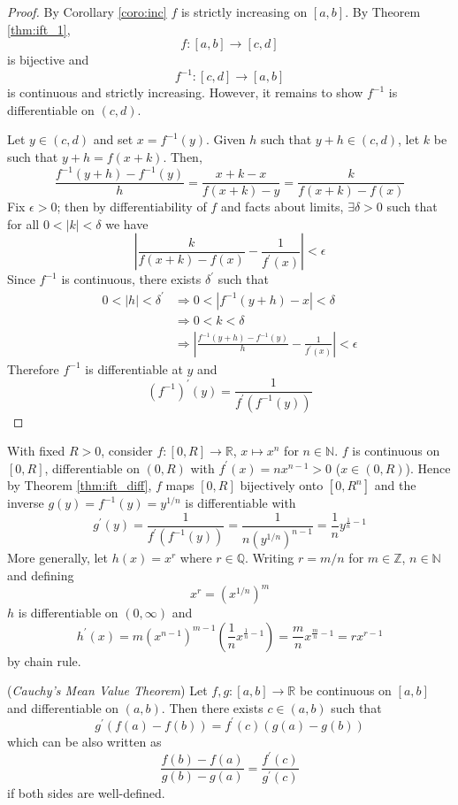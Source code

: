 \documentclass[10pt, a4paper, twoside]{report}
\begin{document}
\begin{proof}
    By Corollary \ref{coro:inc} \(f\) is strictly increasing on \([a,b]\). By Theorem \ref{thm:ift_1}, 
    \[f:[a,b]\to[c,d]\]
    is bijective and 
    \[f^{-1}:[c,d]\to[a,b]\]
    is continuous and strictly increasing. However, it remains to show \(f^{-1}\) is differentiable on \((c,d)\).

    Let \(y\in(c,d)\) and set \(x=f^{-1}(y)\). Given \(h\) such that \(y+h\in(c,d)\), let \(k\) be such that \(y+h=f(x+k)\). Then,
    \[\frac{f^{-1}(y+h)-f^{-1}(y)}{h}=\frac{x+k-x}{f(x+k)-y}=\frac{k}{f(x+k)-f(x)}\]
    Fix \(\epsilon>0\); then by differentiability of \(f\) and facts about limits, \(\exists\delta>0\) such that for all \(0<|k|<\delta\) we have 
    \[\left|\frac{k}{f(x+k)-f(x)}-\frac{1}{f^\prime(x)}\right|<\epsilon\] 
    Since \(f^{-1}\) is continuous, there exists \(\delta^\prime\) such that 
    \begin{align*}
        0<|h|<\delta^\prime&\Rightarrow 0<|f^{-1}(y+h)-x|<\delta \\
        &\Rightarrow 0<k<\delta \\
        &\Rightarrow \left|\frac{f^{-1}(y+h)-f^{-1}(y)}h-\frac{1}{f^\prime(x)}\right|<\epsilon
    \end{align*}
    Therefore \(f^{-1}\) is differentiable at \(y\) and 
    \[(f^{-1})^\prime(y)=\frac{1}{f^\prime(f^{-1}(y))}\]
\end{proof}
With fixed \(R>0\), consider \(f:[0,R]\to\mathbb{R}\), \(x\mapsto x^n\) for \(n\in\mathbb{N}\). \(f\) is continuous on \([0,R]\), differentiable on \((0,R)\) with \(f^\prime(x)=nx^{n-1}>0\) (\(x\in(0,R)\)). Hence by Theorem \ref{thm:ift_diff}, \(f\) maps \([0,R]\) bijectively onto \([0,R^n]\) and the inverse \(g(y)=f^{-1}(y)=y^{1/n}\) is differentiable with 
\[g^\prime(y)=\frac{1}{f^\prime(f^{-1}(y))}=\frac{1}{n(y^{1/n})^{n-1}}=\frac 1ny^{\frac 1n-1}\]
More generally, let \(h(x)=x^r\) where \(r\in\mathbb{Q}\). Writing \(r=m/n\) for \(m\in\mathbb{Z}\), \(n\in\mathbb{N}\) and defining 
\[x^r=\left(x^{1/n}\right)^m\]
\(h\) is differentiable on \((0,\infty)\) and 
\[h^\prime(x)=m\left(x^{n-1}\right)^{m-1}\left(\frac 1nx^{\frac 1n-1}\right)=\frac mnx^{\frac mn-1}=rx^{r-1}\]
by chain rule.
\begin{theorem}
    (\emph{Cauchy's Mean Value Theorem}) Let \(f,g:[a,b]\to\mathbb{R}\) be continuous on \([a,b]\) and differentiable on \((a,b)\). Then there exists \(c\in(a,b)\) such that 
    \[g^\prime(f(a)-f(b))=f^\prime(c)(g(a)-g(b))\]
    which can be also written as 
    \[\frac{f(b)-f(a)}{g(b)-g(a)}=\frac{f^\prime(c)}{g^\prime(c)}\]
    if both sides are well-defined.
    \label{thm:mvt_cauchy}
\end{theorem}
\end{document}
